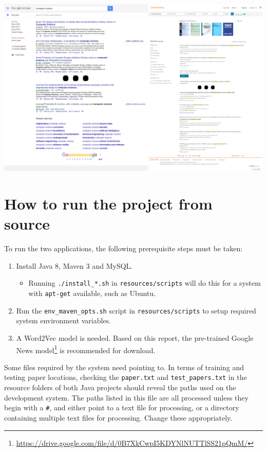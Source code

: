 \begin{appendices}
\includegraphics[width=\textwidth]{img/searchexamples.png}

\chapter{How to run the project from source}
\label{appendix:howtorun}

To run the two applications, the following prerequisite steps must be taken:
\begin{enumerate}
	\item Install Java 8, Maven 3 and MySQL.
	\begin{itemize}
		\item Running \texttt{./install\_*.sh} in \texttt{resources/scripts} will do this for a system with \texttt{apt-get} available, such as Ubuntu.
	\end{itemize}
	\item Run the \texttt{env\_maven\_opts.sh} script in \texttt{resources/scripts} to setup required system environment variables.
	\item A Word2Vec model is needed. Based on this report, the pre-trained Google News model\footnote{\href{https://drive.google.com/file/d/0B7XkCwpI5KDYNlNUTTlSS21pQmM/}{https://drive.google.com/file/d/0B7XkCwpI5KDYNlNUTTlSS21pQmM/}} is recommended for download.
\end{enumerate}

\noindent Some files required by the system need pointing to. 
In terms of training and testing paper locations, checking the \texttt{paper.txt} and \texttt{test\_papers.txt} in the resource folders of both Java projects should reveal the paths used on the development system. The paths listed in this file are all processed unless they begin with a \texttt{\#}, and either point to a text file for processing, or a directory containing multiple text files for processing. Change these appropriately. 


\end{appendices}
